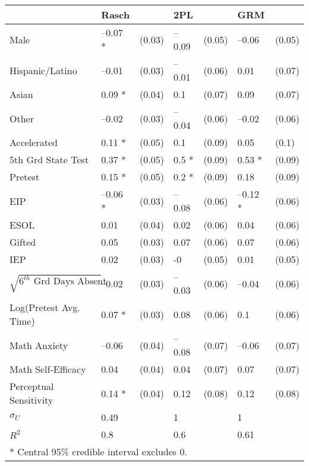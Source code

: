 \begin{tabular}{lllllll}
  \hline
  & Rasch &  & 2PL &  & GRM &  \\ 
   \hline
Male & --0.07 * & (0.03) & --0.09 & (0.05) & --0.06 & (0.05) \\ 
  Hispanic/Latino & --0.01 & (0.03) & --0.01 & (0.06) & 0.01 & (0.07) \\ 
  Asian & 0.09 * & (0.04) & 0.1 & (0.07) & 0.09 & (0.07) \\ 
  Other & --0.02 & (0.03) & --0.04 & (0.06) & --0.02 & (0.06) \\ 
  Accelerated & 0.11 * & (0.05) & 0.1 & (0.09) & 0.05 & (0.1) \\ 
  5th Grd State Test & 0.37 * & (0.05) & 0.5 * & (0.09) & 0.53 * & (0.09) \\ 
  Pretest & 0.15 * & (0.05) & 0.2 * & (0.09) & 0.18 & (0.09) \\ 
  EIP & --0.06 * & (0.03) & --0.08 & (0.06) & --0.12 * & (0.06) \\ 
  ESOL & 0.01 & (0.04) & 0.02 & (0.06) & 0.04 & (0.06) \\ 
  Gifted & 0.05 & (0.03) & 0.07 & (0.06) & 0.07 & (0.06) \\ 
  IEP & 0.02 & (0.03) & -0 & (0.05) & 0.01 & (0.05) \\ 
  $\sqrt{6^{th}\mbox{ Grd Days Absent}}$ & --0.02 & (0.03) & --0.03 & (0.06) & --0.04 & (0.06) \\ 
  Log(Pretest Avg. Time) & 0.07 * & (0.03) & 0.08 & (0.06) & 0.1 & (0.06) \\ 
  Math Anxiety & --0.06 & (0.04) & --0.08 & (0.07) & --0.06 & (0.07) \\ 
  Math Self-Efficacy & 0.04 & (0.04) & 0.04 & (0.07) & 0.07 & (0.07) \\ 
  Perceptual Sensitivity & 0.14 * & (0.04) & 0.12 & (0.08) & 0.12 & (0.08) \\ 
   \hline
$\sigma_U$ & 0.49 &  & 1 &  & 1 &  \\ 
  $R^2$ & 0.8 &  & 0.6 &  & 0.61 &  \\ 
   \hline
\multicolumn{7}{l}{* Central 95\% credible interval excludes 0.} &  &  &  &  &  &  \\ 
  \end{tabular}
